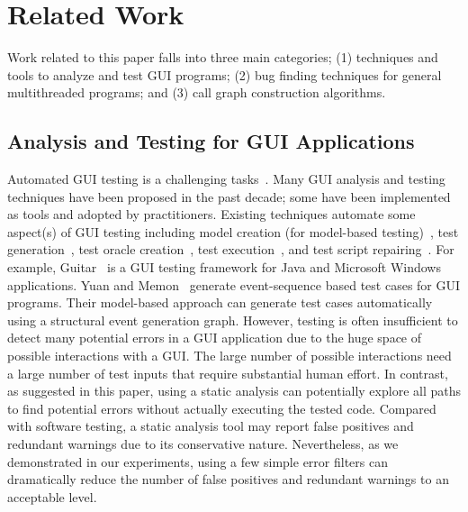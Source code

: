 \section{Related Work}

Work related to this paper falls into three main categories; (1)
techniques and tools to analyze and test GUI programs; (2)
bug finding techniques for general multithreaded programs; and (3)
call graph construction algorithms.

\subsection{Analysis and Testing for GUI Applications}

Automated GUI testing is a challenging tasks~\cite{Bertolino:2007:STR:1253532.1254712,
Harrold:2000:TR:336512.336532}.
 Many GUI analysis and testing techniques have been proposed in the past decade; some have been
implemented as tools and adopted by practitioners. Existing techniques automate
some aspect(s) of GUI testing including model creation
(for model-based testing)~\cite{androidtesting}, %
test generation~\cite{YuanMemonICSE2007},
test oracle creation~\cite{MemonFSE2000}, test execution~\cite{YuanCohenMemonTSE2011},
and test script repairing~\cite{Huang:2010:RGT:1828417.1828465, Daniel:2011:AGR:2002931.2002937}.
For example,
Guitar~\cite{YuanCohenMemonTSE2011, YuanMemonICSE2007}%
is a GUI testing framework for Java and Microsoft Windows applications. 
Yuan and Memon~\cite{YuanMemonICSE2007} generate event-sequence based test cases for GUI
programs. Their model-based approach can generate test cases automatically using a structural event
generation graph. 
However, testing is often insufficient to detect many potential
errors in a GUI application
due to the huge space of possible interactions
with a GUI. The large number of possible interactions
need a large number of test inputs that require substantial human effort.
In contrast, as suggested in this paper,
using a static analysis can potentially explore
all paths to find potential errors without actually executing the tested code. 
Compared with software testing, a static analysis tool may
report false positives and redundant warnings due to its conservative nature.
Nevertheless, as we demonstrated in our experiments, using a few simple error
filters can dramatically reduce the number of false positives and redundant warnings to
an acceptable level.



